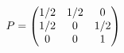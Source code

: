 \documentclass[preview]{standalone}
\begin{document}
\begin{align*}
\special{dvisvgm:raw <g id='unique000'>}P=\begin{pmatrix}1/2&1/2&0\\1/2&0&1/2\\0&0&1\end{pmatrix}\special{dvisvgm:raw </g>}
\end{align*}
\end{document}
